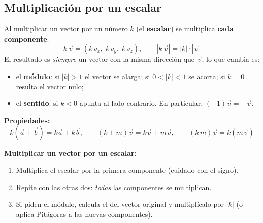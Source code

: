 \documentclass[12pt, letterpaper]{article}
\begin{document}
\subsection{Multiplicación por un escalar}

\begin{cuadroteoria}
  Al multiplicar un vector por un número $k$ (el \textbf{escalar}) se multiplica \textbf{cada componente}:
  $$k\,\vec{v} = (k\,v_x,\; k\,v_y,\; k\,v_z), \qquad |k\,\vec{v}| = |k| \cdot |\vec{v}|$$
  El resultado es \emph{siempre} un vector con la misma dirección que $\vec{v}$; lo que cambia es:
  \begin{itemize}[leftmargin=*]
    \item el \textbf{módulo}: si $|k| > 1$ el vector se alarga; si $0 < |k| < 1$ se acorta; si $k = 0$ resulta el vector nulo;
    \item el \textbf{sentido}: si $k < 0$ apunta al lado contrario. En particular, $(-1)\vec{v} = -\vec{v}$.
  \end{itemize}
  \begin{center}
  \end{center}
  \textbf{Propiedades:}
  $$k(\vec{a}+\vec{b}) = k\vec{a} + k\vec{b}, \qquad (k+m)\vec{v} = k\vec{v} + m\vec{v}, \qquad (k\,m)\vec{v} = k(m\vec{v})$$
\end{cuadroteoria}

\begin{cuadropasos}
  \textbf{Multiplicar un vector por un escalar:}
  \begin{enumerate}[leftmargin=*]
    \item Multiplica el escalar por la primera componente (cuidado con el signo).
    \item Repite con las otras dos: \emph{todas} las componentes se multiplican.
    \item Si piden el módulo, calcula el del vector original y multiplícalo por $|k|$ (o aplica Pitágoras a las nuevas componentes).
  \end{enumerate}
\end{cuadropasos}
\end{document}
